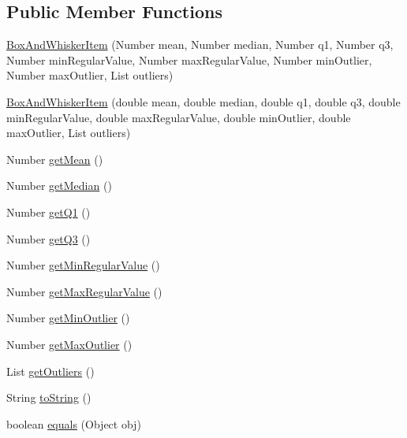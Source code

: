 \subsection*{Public Member Functions}
\begin{DoxyCompactItemize}
\item 
\mbox{\hyperlink{classorg_1_1jfree_1_1data_1_1statistics_1_1_box_and_whisker_item_afa69e1dad3c898bfb78684839cec62ff}{Box\+And\+Whisker\+Item}} (Number mean, Number median, Number q1, Number q3, Number min\+Regular\+Value, Number max\+Regular\+Value, Number min\+Outlier, Number max\+Outlier, List outliers)
\item 
\mbox{\hyperlink{classorg_1_1jfree_1_1data_1_1statistics_1_1_box_and_whisker_item_a4b9e6c2c3cc417794c253e8b5fcb798f}{Box\+And\+Whisker\+Item}} (double mean, double median, double q1, double q3, double min\+Regular\+Value, double max\+Regular\+Value, double min\+Outlier, double max\+Outlier, List outliers)
\item 
Number \mbox{\hyperlink{classorg_1_1jfree_1_1data_1_1statistics_1_1_box_and_whisker_item_a6a500b4eb21e6dab1a7221d56faebe06}{get\+Mean}} ()
\item 
Number \mbox{\hyperlink{classorg_1_1jfree_1_1data_1_1statistics_1_1_box_and_whisker_item_a6bdd9a24224ba9b6cc74243763b2ee07}{get\+Median}} ()
\item 
Number \mbox{\hyperlink{classorg_1_1jfree_1_1data_1_1statistics_1_1_box_and_whisker_item_abfcae16222389c2f8254c9f462dce5ee}{get\+Q1}} ()
\item 
Number \mbox{\hyperlink{classorg_1_1jfree_1_1data_1_1statistics_1_1_box_and_whisker_item_a4830fcff71e8201b297fe5705d939332}{get\+Q3}} ()
\item 
Number \mbox{\hyperlink{classorg_1_1jfree_1_1data_1_1statistics_1_1_box_and_whisker_item_a59641655b4aca104cdd4751c0b440eba}{get\+Min\+Regular\+Value}} ()
\item 
Number \mbox{\hyperlink{classorg_1_1jfree_1_1data_1_1statistics_1_1_box_and_whisker_item_a0bafb76524a3ec69cd6bea288e2a24da}{get\+Max\+Regular\+Value}} ()
\item 
Number \mbox{\hyperlink{classorg_1_1jfree_1_1data_1_1statistics_1_1_box_and_whisker_item_a919c5a96a477532a3b97ad1c5d4f6dc0}{get\+Min\+Outlier}} ()
\item 
Number \mbox{\hyperlink{classorg_1_1jfree_1_1data_1_1statistics_1_1_box_and_whisker_item_af4a38df92ebdfb72da5c17d374472fd5}{get\+Max\+Outlier}} ()
\item 
List \mbox{\hyperlink{classorg_1_1jfree_1_1data_1_1statistics_1_1_box_and_whisker_item_aecdc2d092041588b82c36bf1a04a5e75}{get\+Outliers}} ()
\item 
String \mbox{\hyperlink{classorg_1_1jfree_1_1data_1_1statistics_1_1_box_and_whisker_item_aafebe700ebe4c9859e7583f022c4e0ee}{to\+String}} ()
\item 
boolean \mbox{\hyperlink{classorg_1_1jfree_1_1data_1_1statistics_1_1_box_and_whisker_item_a5cb1b2aa447cfde980d5bf2878be0d94}{equals}} (Object obj)
\end{DoxyCompactItemize}


